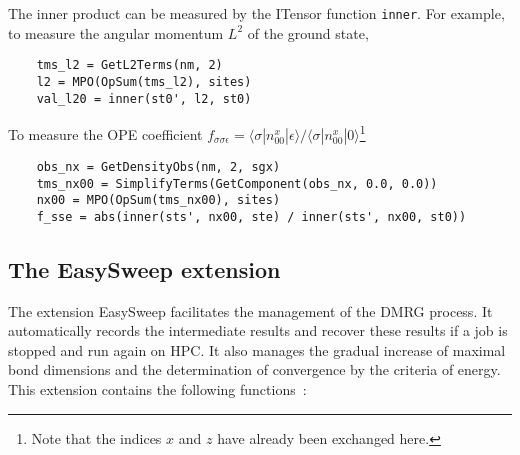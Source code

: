 \documentclass{timesjhep}
\begin{document}
The inner product can be measured by the ITensor function \lstinline|inner|. For example, to measure the angular momentum $L^2$ of the ground state,
\begin{lstlisting}
    tms_l2 = GetL2Terms(nm, 2)
    l2 = MPO(OpSum(tms_l2), sites)
    val_l20 = inner(st0', l2, st0)
\end{lstlisting}
To measure the OPE coefficient $f_{\sigma\sigma\epsilon}=\langle \sigma|n^x_{00}|\epsilon\rangle/\langle \sigma|n^x_{00}|0\rangle$\footnote{Note that the indices $x$ and $z$ have already been exchanged here. }
\begin{lstlisting}
    obs_nx = GetDensityObs(nm, 2, sgx)
    tms_nx00 = SimplifyTerms(GetComponent(obs_nx, 0.0, 0.0))
    nx00 = MPO(OpSum(tms_nx00), sites)
    f_sse = abs(inner(sts', nx00, ste) / inner(sts', nx00, st0))
\end{lstlisting}

\subsection{The EasySweep extension}

The extension EasySweep facilitates the management of the DMRG process. It automatically records the intermediate results and recover these results if a job is stopped and run again on HPC. It also manages the gradual increase of maximal bond dimensions and the determination of convergence by the criteria of energy. This extension contains the following functions~:
\end{document}
